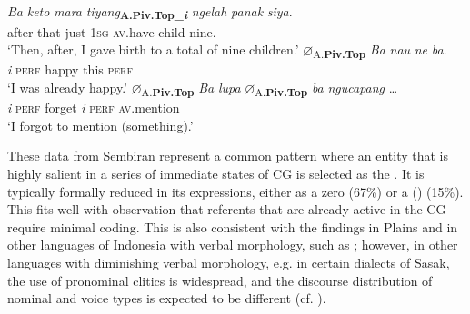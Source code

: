 \documentclass[output=paper
,modfonts
,nonflat]{langsci/langscibook}
\begin{document}
\begin{exe}
	\label{e:arka:33}\\
	\begin{xlist}
		\ex\label{e:arka:33a}
		\gll \textit{Ba} \textit{keto} \textit{mara} {\ob}\textit{tiyang}{\cb}\textbf{\textsubscript{A.Piv.Top\_\textit{i}}} \textit{ngelah} \textit{panak} \textit{siya}.\\
		after  that   just  \phantom{[}1\textsc{sg}  \textsc{av.}have  child  nine.\\
		\glt ‘Then, after, I gave birth to a total of nine children.’ 
		\ex\label{e:arka:33b}
		\gll {\ob}${\varnothing}${\cb}\textsubscript{A.\textbf{Piv.Top}}  \textit{Ba}   \textit{nau}   \textit{ne}   \textit{ba}.\\
		\phantom{[}\textit{i}  \textsc{perf}  happy  this  \textsc{perf}\\
		\glt ‘I was already happy.’		
		\ex\label{e:arka:33c}
		\gll {\ob}${\varnothing}${\cb}\textsubscript{A.\textbf{Piv.Top}}  \textit{Ba}   \textit{lupa} {\ob}${\varnothing}${\cb}\textsubscript{A.\textbf{Piv.Top}} \textit{ba} \textit{ngucapang} …\\
		\phantom{[}\textit{i}  \textsc{perf}  forget  \phantom{[}\textit{i}  \textsc{perf}  \textsc{av}.mention\\
		\glt ‘I forgot to mention (something).’
	\end{xlist}
\end{exe}

\noindent
These data from Sembiran  represent a common pattern where an entity that is highly salient in a series of immediate states of CG is selected as the . It is typically formally reduced in its expressions, either as a zero  (67\%) or a ()  (15\%). This fits well with  observation that referents that are already active in the CG require minimal coding. This is also consistent with the findings in Plains  \citep{Pastika2006} and in other  languages of Indonesia with verbal  morphology, such as  \citep{Quick2005}; however, in other  languages with diminishing verbal  morphology, e.g. in certain dialects of Sasak, the use of pronominal clitics is widespread, and the discourse distribution of nominal and voice types is expected to be different (cf. \citealt{Wouk1999}).
\end{document}
